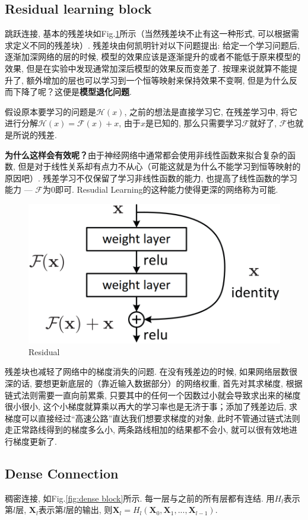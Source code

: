 \subsection{Residual learning block}
跳跃连接, 基本的残差块如Fig.\ref{fig:residual}所示（当然残差块不止有这一种形式, 可以根据需求定义不同的残差块）. 残差块由何凯明针对以下问题提出: 给定一个学习问题后, 逐渐加深网络的层的时候, 模型的效果应该是逐渐提升的或者不能低于原来模型的效果, 但是在实验中发现通常加深后模型的效果反而变差了. 按理来说就算不能提升了, 额外增加的层也可以学习到一个恒等映射来保持效果不变啊, 但是为什么反而下降了呢？这便是\textbf{模型退化问题}. 

假设原本要学习的问题是$\mathcal{H}(x)$, 之前的想法是直接学习它, 在残差学习中, 将它进行分解$\mathcal{H}(x) = \mathcal{F}(x) + x$, 由于$x$是已知的, 那么只需要学习$\mathcal{F}$就好了, $\mathcal{F}$也就是所说的残差. 

\textbf{为什么这样会有效呢？}由于神经网络中通常都会使用非线性函数来拟合复杂的函数, 但是对于线性关系却有点力不从心（可能这就是为什么不能学习到恒等映射的原因吧）. 残差学习不仅保留了学习非线性函数的能力, 也提高了线性函数的学习能力 --- $\mathcal{F}$为0即可. Resudial Learning的这种能力使得更深的网络称为可能. 

\begin{figure}[h]
	\centering
	\includegraphics[width=.4\textwidth]{pics/Residual.png}
	\caption{Residual}
	\label{fig:residual}
\end{figure}

残差块也减轻了网络中的梯度消失的问题. 在没有残差边的时候, 如果网络层数很深的话, 要想更新底层的（靠近输入数据部分）的网络权重, 首先对其求梯度, 根据链式法则需要一直向前累乘, 只要其中的任何一个因数过小就会导致求出来的梯度很小很小, 这个小梯度就算乘以再大的学习率也是无济于事；添加了残差边后, 求梯度可以直接经过“高速公路”直达我们想要求梯度的对象, 此时不管通过链式法则走正常路线得到的梯度多么小, 两条路线相加的结果都不会小, 就可以很有效地进行梯度更新了. 

\subsection{Dense Connection}
稠密连接, 如Fig.\ref{fig:dense block}所示. 每一层与之前的所有层都有连结. 用$H_l$表示第$l$层, $\boldsymbol{X}_l$表示第$l$层的输出, 则$\boldsymbol{X}_l = H_l(\boldsymbol{X}_0, \boldsymbol{X}_1, ..., \boldsymbol{X}_{l-1})$. 

